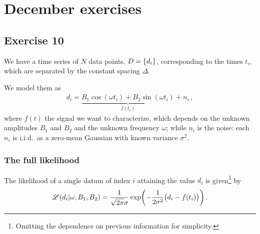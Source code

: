\documentclass[main.tex]{subfiles}
\begin{document}
\section{December exercises}

\subsection{Exercise 10}

We have a time series of \(N\) data points, \(D = \qty{d_i}\), corresponding to the times \(t_i\), which are separated by the constant spacing \(\Delta \).

We model them as 
%
\begin{align}
d_i = \underbrace{B_1  \cos(\omega t_i) + B_2 \sin(\omega t_i)}_{f(t_i)} + n_i
\,,
\end{align}
%
where \(f(t)\) the signal we want to characterize, which depends on the unknown amplitudes \(B_1 \) and \(B_2 \) and the unknown frequency \(\omega \); while \(n_i \) is the noise: each \(n_i\) is i.i.d.\ as a zero-mean Gaussian with known variance \(\sigma^2\). 

\subsubsection{The full likelihood}

The likelihood of a single datum of index \(i\) attaining the value \(d_i\) is given\footnote{Omitting the dependence on previous information for simplicity.} by 
%
\begin{align}
\mathscr{L} (d_i | \omega , B_1 , B_2 ) = \frac{1}{\sqrt{2 \pi } \sigma }\exp(- \frac{1}{2 \sigma^2}\qty(d_i - f(t_i)))
\,.
\end{align}
\end{document}
